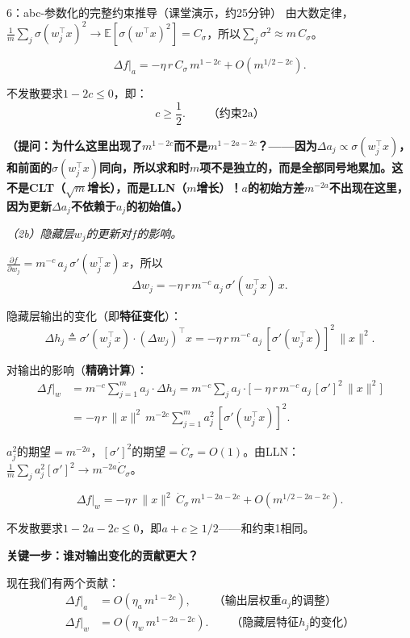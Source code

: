 \documentclass[11pt,a4paper]{article}
\newcommand{\E}{\mathbb{E}}
\begin{document}
\begin{handcalc}{6：abc-参数化的完整约束推导（课堂演示，约25分钟）}
由大数定律，$\frac{1}{m}\sum_j \sigma(w_j^\top x)^2 \to \E[\sigma(w^\top x)^2] = C_\sigma$，所以$\sum_j\sigma^2\approx m\,C_\sigma$。

\[
\boxed{\Delta f\big|_a = -\eta\,r\,C_\sigma\,m^{1-2c} + O(m^{1/2-2c}).}
\]

不发散要求$1-2c\le 0$，即：
\[
\boxed{c\ge \frac{1}{2}.}\qquad\text{（约束2a）}
\]

\textbf{（提问：为什么这里出现了$m^{1-2c}$而不是$m^{1-2a-2c}$？——因为$\Delta a_j\propto\sigma(w_j^\top x)$，和前面的$\sigma(w_j^\top x)$\textbf{同向}，所以求和时$m$项\textbf{不是独立的}，而是全部同号地累加。这不是CLT（$\sqrt{m}$增长），而是LLN（$m$增长）！$a$的初始方差$m^{-2a}$不出现在这里，因为更新$\Delta a_j$不依赖于$a_j$的初始值。）}

\medskip
\textit{（2b）隐藏层$w_j$的更新对$f$的影响。}

$\frac{\partial f}{\partial w_j} = m^{-c}\,a_j\,\sigma'(w_j^\top x)\,x$，所以
\[
\Delta w_j = -\eta\,r\,m^{-c}\,a_j\,\sigma'(w_j^\top x)\,x.
\]

隐藏层输出的变化（即\textbf{特征变化}）：
\[
\Delta h_j \triangleq \sigma'(w_j^\top x)\cdot(\Delta w_j)^\top x = -\eta\,r\,m^{-c}\,a_j\,[\sigma'(w_j^\top x)]^2\,\|x\|^2.
\]

对输出的影响（\textbf{精确计算}）：
\begin{align}
\Delta f\big|_w &= m^{-c}\sum_{j=1}^m a_j\cdot\Delta h_j = m^{-c}\sum_j a_j\cdot\big[-\eta\,r\,m^{-c}\,a_j\,[\sigma']^2\,\|x\|^2\big] \\
&= -\eta\,r\,\|x\|^2\,m^{-2c}\sum_{j=1}^m a_j^2\,[\sigma'(w_j^\top x)]^2.
\end{align}

$a_j^2$的期望$=m^{-2a}$，$[\sigma']^2$的期望$=\dot C_\sigma=O(1)$。由LLN：$\frac{1}{m}\sum_j a_j^2[\sigma']^2\to m^{-2a}\dot C_\sigma$。

\[
\boxed{\Delta f\big|_w = -\eta\,r\,\|x\|^2\,\dot C_\sigma\,m^{1-2a-2c} + O(m^{1/2-2a-2c}).}
\]

不发散要求$1-2a-2c\le 0$，即$a+c\ge 1/2$——和约束1相同。

\bigskip
\textbf{关键一步：谁对输出变化的贡献更大？}

现在我们有两个贡献：
\begin{align}
\Delta f\big|_a &= O(\eta_a\,m^{1-2c}), \qquad \text{（输出层权重$a_j$的调整）} \\
\Delta f\big|_w &= O(\eta_w\,m^{1-2a-2c}). \qquad \text{（隐藏层特征$h_j$的变化）}
\end{align}


\end{handcalc}
\end{document}
